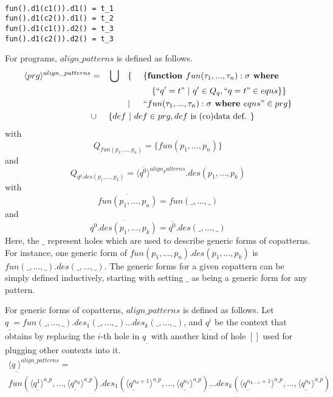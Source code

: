 \documentclass[11pt]{article} %
\begin{document}
\begin{itemize}
\begin{lstlisting}

fun().d1(c1()).d1() = t_1
fun().d1(c2()).d1() = t_2
fun().d1(c1()).d2() = t_3
fun().d1(c2()).d2() = t_3

\end{lstlisting}

For programs, $align\_patterns$ is defined as follows.
\begin{alignat*}{4}
\langle prg \rangle^{align\_patterns} & = &&\bigcup &&\{ ~&&\{ \textrm{\textbf{function }} fun(\tau_1, ..., \tau_n): \sigma \textrm{\textbf{ where }} \\
& && && &&\quad \{ `` q' = t " ~ | ~ q' \in Q_q, `` q = t " \in eqns \} \} \\
& && && | && `` fun (\tau_1, ..., \tau_n): \sigma \textrm{\textbf{ where }} eqns " \in prg \} \\
& \cup && \{ def ~ | ~ def \in prg, def \textrm{ is (co)data def. } \} \span\span\span\span
\end{alignat*}
with
\begin{equation*}
Q_{fun(p_1, ..., p_n)} = \{fun(p_1, ..., p_n)\}
\end{equation*}
and
\begin{equation*}
Q_{q^0.des(p_1, ..., p_k)} = \langle \overline{q^0} \rangle^{align_patterns}.des(p_1, ..., p_k)
\end{equation*}
with
\begin{equation*}
\overline{fun(p_1, ..., p_n)} = fun(\_, ..., \_)
\end{equation*}
and
\begin{equation*}
\overline{q^0.des(p_1, ..., p_k)} = \overline{q^0}.des(\_, ..., \_)
\end{equation*}
Here, the $\_$ represent holes which are used to describe generic forms of copatterns. For instance, one generic form of $fun(p_1, ..., p_n).des(p_1, ..., p_k)$ is $fun(\_, ..., \_).des(\_, ..., \_)$. The generic forms for a given copattern can be simply defined inductively, starting with setting $\_$ as being a generic form for any pattern.

For generic forms of copatterns, $align\_patterns$ is defined as follows. Let $q_\_ = fun(\_, ..., \_).des_1(\_, ..., \_)...des_k(\_, ..., \_)$, and $q^i_\_$ be the context that obtains by replacing the $i$-th hole in $q_\_$ with another kind of hole $[]$ used for plugging other contexts into it.
\begin{multline*}
\langle q_\_ \rangle^{align\_patterns} = \\
fun(\langle q^1_\_ \rangle^{a\_p}, ..., \langle q^{n_0}_\_ \rangle^{a\_p}).des_1(\langle q^{n_0 + 1}_\_ \rangle^{a\_p}, ..., \langle q^{n_1}_\_ \rangle^{a\_p})...des_k(\langle q^{n_{k-1} + 1}_\_ \rangle^{a\_p}, ..., \langle q^{n_k}_\_ \rangle^{a\_p})
\end{multline*}


\end{itemize}
\end{document}
